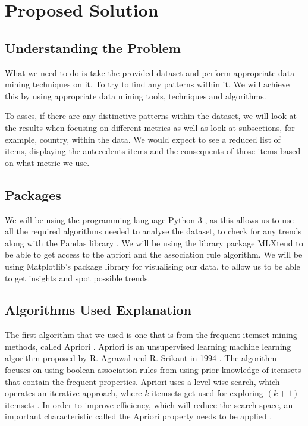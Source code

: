 \documentclass[a4paper,10pt]{article}
\begin{document}
\section{Proposed Solution}

\subsection{Understanding the Problem}

What we need to do is take the provided dataset and perform appropriate data mining techniques on it. To try to find any patterns within it. We will achieve this by using appropriate data mining tools, techniques and algorithms.

To asses, if there are any distinctive patterns within the dataset, we will look at the results when focusing on different metrics as well as look at subsections, for example, country, within the data. We would expect to see a reduced list of items, displaying the antecedents items and the consequents of those items based on what metric we use.

\subsection{Packages}

We will be using the programming language Python 3 \cite{Python}, as this allows us to use all the required algorithms needed to analyse the dataset, to check for any trends along with the Pandas library \cite{mckinney-proc-scipy-2010}. We will be using the library package MLXtend\cite{raschkas_2018_mlxtend} to be able to get access to the apriori and the association rule algorithm. We will be using Matplotlib's \cite{hunter2007matplotlib} package library for visualising our data, to allow us to be able to get insights and spot possible trends.

\subsection{Algorithms Used Explanation}

The first algorithm that we used is one that is from the frequent itemset mining methods, called Apriori \cite{han2011data}. Apriori is an unsupervised learning machine learning algorithm proposed by R. Agrawal and R. Srikant in 1994 \cite{agrawal1994fast, geron2019hands}. The algorithm focuses on using boolean association rules \cite{agrawal1994fast} from using prior knowledge of itemsets that contain the frequent properties. Apriori uses a level-wise search, which operates an iterative approach, where $k$-itemsets get used for exploring $(k+1)$-itemsets \cite{jingjingslides}. In order to improve efficiency, which will reduce the search space, an important characteristic called the Apriori property needs to be applied \cite{han2011data}. 
\end{document}
